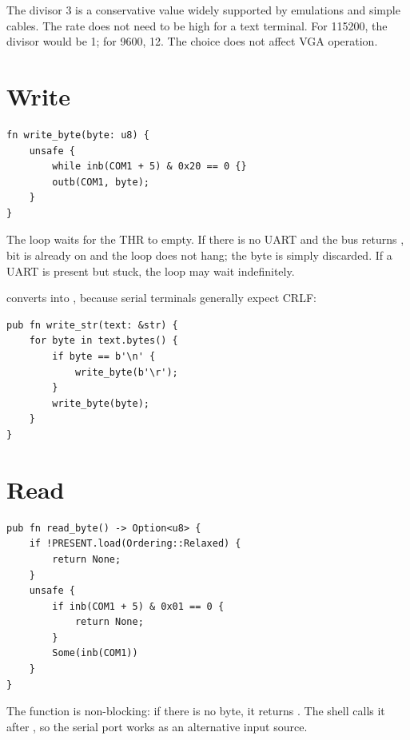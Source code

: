 \begin{nota}
The divisor 3 is a conservative value widely supported by emulations and simple
cables. The rate does not need to be high for a text terminal. For 115200, the
divisor would be 1; for 9600, 12. The choice does not affect VGA operation.
\end{nota}

\section{Write}

\begin{lstlisting}[caption={Sending one byte through the UART.},label={lst:uartwrite}]
fn write_byte(byte: u8) {
    unsafe {
        while inb(COM1 + 5) & 0x20 == 0 {}
        outb(COM1, byte);
    }
}
\end{lstlisting}

The loop waits for the THR to empty. If there is no UART and the bus returns
, bit  is already on and the loop does not hang; the
byte is simply discarded. If a UART is present but stuck, the loop may wait
indefinitely.

 converts  into , because serial terminals generally expect CRLF:

\begin{lstlisting}[caption={Writing a string with newline conversion.},label={lst:uartstr}]
pub fn write_str(text: &str) {
    for byte in text.bytes() {
        if byte == b'\n' {
            write_byte(b'\r');
        }
        write_byte(byte);
    }
}
\end{lstlisting}

\section{Read}

\begin{lstlisting}[caption={Non-blocking read of one byte.},label={lst:uartread}]
pub fn read_byte() -> Option<u8> {
    if !PRESENT.load(Ordering::Relaxed) {
        return None;
    }
    unsafe {
        if inb(COM1 + 5) & 0x01 == 0 {
            return None;
        }
        Some(inb(COM1))
    }
}
\end{lstlisting}

The function is non-blocking: if there is no byte, it returns . The
shell calls it after , so the serial port works as
an alternative input source.

